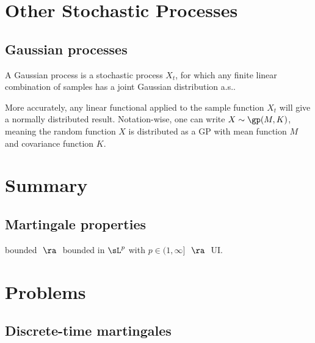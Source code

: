 \section{Other Stochastic Processes}

\subsection{Gaussian processes}

\begin{definition}\label{def:gaussian_process}
A Gaussian process is a stochastic process $X_t$, for which any finite linear combination of samples has a joint Gaussian distribution a.s..

More accurately, any linear functional applied to the sample function $X_t$ will give a normally distributed result. Notation-wise, one can write $X \sim \gp(M,K)$, meaning the random function $X$ is distributed as a GP with mean function $M$ and covariance function $K$.
\end{definition}

\section{Summary}

\subsection{Martingale properties}

bounded $\ \ra\ $ bounded in $\sL^p$ with $p\in (1,\infty]$ $\ \ra \ $ UI.


\section{Problems}

\subsection{Discrete-time martingales}

